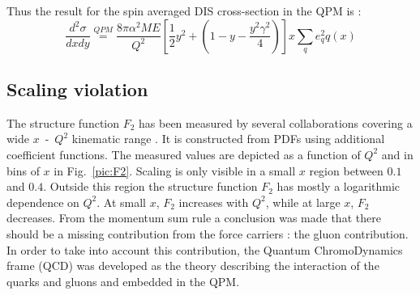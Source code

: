 Thus the result for the spin averaged DIS cross-section in the QPM is \cite{BERGER} :
%
\begin{equation}
  \frac{d^2\sigma}{dxdy} \stackrel{QPM}{=} \frac{8\pi\alpha^2ME}{Q^2}\left[\frac{1}{2}y^2+\left(1-y-\frac{y^2\gamma^2}{4}\right)\right]x\sum\limits_{q}e^2_qq(x)
\end{equation}

\subsection{Scaling violation}

The structure function $F_2$ has been measured by several collaborations covering a wide $x$~-~$Q^2$ kinematic range \cite{PDG}. It is constructed from PDFs using additional coefficient functions. The measured values are depicted as a function of $Q^2$ and in bins of $x$ in Fig.~\ref{pic:F2}. Scaling is only visible in a small $x$ region between $0.1$ and $0.4$. Outside this region the structure function $F_2$ has mostly a logarithmic dependence on $Q^2$. At small $x$, $F_2$ increases with $Q^2$, while at large $x$, $F_2$ decreases. From the momentum sum rule a conclusion was made that there should be a missing contribution from the force carriers : the gluon contribution. In order to take into account this contribution, the Quantum ChromoDynamics frame (QCD) was developed as the theory describing the interaction of the quarks and gluons and embedded in the QPM.

